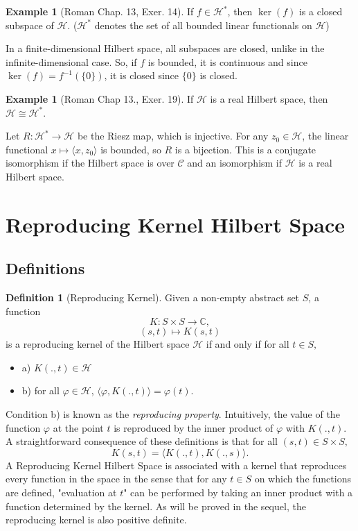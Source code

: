 \documentclass[psamsfonts]{amsart}
\theoremstyle{definition}
\newtheorem{exmp}[thm]{Example}
\newtheorem{defn}[thm]{Definition}
\theoremstyle{remark}
\numberwithin{equation}{section}
\begin{document}
\begin{exmp} [Roman Chap. 13, Exer. 14] If $f \in \mathcal{H}^*$, then $\ker (f)$ is a closed subspace of $\mathcal{H}$. ($\mathcal{H}^*$ denotes the set of all bounded linear functionals on $\mathcal{H}$)

In a finite-dimensional Hilbert space, all subspaces are closed, unlike in the infinite-dimensional case. So, if $f$ is bounded, it is continuous and since $\ker (f) = f^{-1} (\{ 0 \} )$, it is closed since $\{ 0 \}$ is closed. 

\end{exmp}

\begin{exmp} [Roman Chap 13., Exer. 19]If $\mathcal{H}$ is a real Hilbert space, then $\mathcal{H} \cong \mathcal{H}^*$. 

Let $R: \mathcal{H} ^* \rightarrow \mathcal{H}$ be the Riesz map, which is injective. For any $z_0 \in \mathcal{H}$, the linear functional $x \mapsto \langle x, z_0 \rangle$ is bounded, so $R$ is a bijection. This is a conjugate isomorphism if the Hilbert space is over $\mathcal{C}$ and an isomorphism if $\mathcal{H}$ is a real Hilbert space. 
\end{exmp}

\section{Reproducing Kernel Hilbert Space}
\subsection{Definitions}
\begin{defn}[Reproducing Kernel]
Given a non-empty abstract set $S$, a function 
$$K : S \times S \rightarrow \mathbb{C},$$
$$(s, t) \mapsto K(s,t) $$
is a reproducing kernel of the Hilbert space $\mathcal{H}$ if and only if for all $t \in S,$
\begin{itemize}
    \item a) $K(. ,t) \in \mathcal{H}$
    \item b) for all $\varphi \in \mathcal{H}$, $\langle \varphi , K(. , t) \rangle = \varphi (t).$ 
\end{itemize}
Condition b) is known as the \textit{reproducing property}. Intuitively, the value of the function $\varphi$ at the point $t$ is reproduced by the inner product of $\varphi$ with $K(. , t)$. A straightforward consequence of these definitions is that for all $(s,t) \in S \times S,$ 
$$K(s, t) = \langle K(., t), K(., s) \rangle.$$
A Reproducing Kernel Hilbert Space is associated with a kernel that reproduces every function in the space in the sense that for any $t \in S$ on which the functions are defined, "evaluation at $t$" can be performed by taking an inner product with a function determined by the kernel. As will be proved in the sequel, the reproducing kernel is also positive definite. 
\end{defn}
\end{document}
